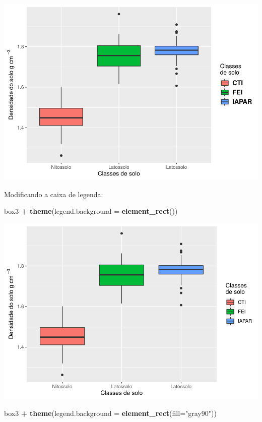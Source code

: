 \documentclass[
]{book}
\newenvironment{Shaded}{\begin{snugshade}}{\end{snugshade}}
\newcommand{\DataTypeTok}[1]{\textcolor[rgb]{0.13,0.29,0.53}{#1}}
\newcommand{\KeywordTok}[1]{\textcolor[rgb]{0.13,0.29,0.53}{\textbf{#1}}}
\newcommand{\NormalTok}[1]{#1}
\newcommand{\OperatorTok}[1]{\textcolor[rgb]{0.81,0.36,0.00}{\textbf{#1}}}
\newcommand{\StringTok}[1]{\textcolor[rgb]{0.31,0.60,0.02}{#1}}
\begin{document}
\includegraphics{TudodoR_files/figure-latex/unnamed-chunk-213-2.pdf}

Modificando a caixa de legenda:

\begin{Shaded}
\begin{Highlighting}[]
\NormalTok{box3 }\OperatorTok{+}\StringTok{ }\KeywordTok{theme}\NormalTok{(}\DataTypeTok{legend.background =} \KeywordTok{element_rect}\NormalTok{())}
\end{Highlighting}
\end{Shaded}

\includegraphics{TudodoR_files/figure-latex/unnamed-chunk-214-1.pdf}

\begin{Shaded}
\begin{Highlighting}[]
\NormalTok{box3 }\OperatorTok{+}\StringTok{ }\KeywordTok{theme}\NormalTok{(}\DataTypeTok{legend.background =} \KeywordTok{element_rect}\NormalTok{(}\DataTypeTok{fill=}\StringTok{"gray90"}\NormalTok{))}
\end{Highlighting}
\end{Shaded}
\end{document}
